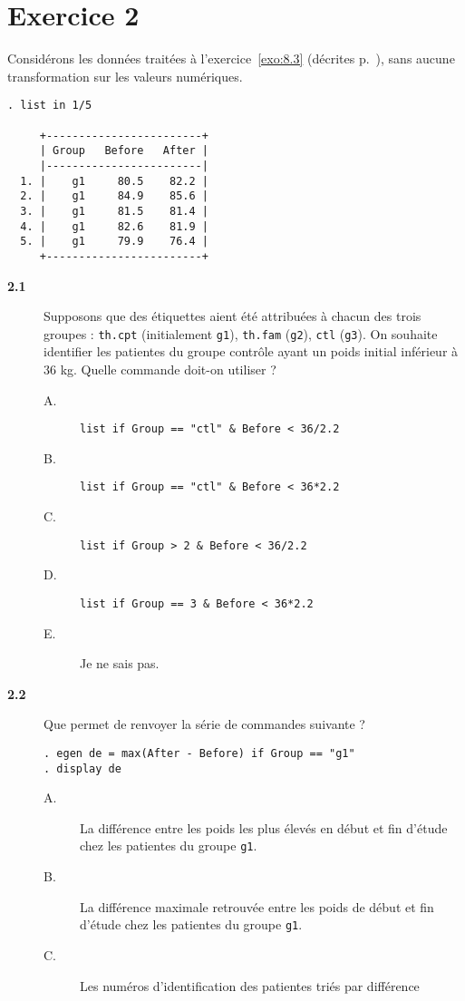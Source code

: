 \section*{Exercice 2}
Considérons les données traitées à l'exercice~\ref{exo:8.3} (décrites
p.~\pageref{exo:8.3}), sans aucune transformation sur les valeurs
numériques. 
\begin{verbatim}
. list in 1/5

     +------------------------+
     | Group   Before   After |
     |------------------------|
  1. |    g1     80.5    82.2 |
  2. |    g1     84.9    85.6 |
  3. |    g1     81.5    81.4 |
  4. |    g1     82.6    81.9 |
  5. |    g1     79.9    76.4 |
     +------------------------+
\end{verbatim}
\begin{description}
\item[\bf 2.1] Supposons que des étiquettes aient été attribuées à chacun
  des trois groupes : \texttt{th.cpt} (initialement \texttt{g1}),
  \texttt{th.fam} (\texttt{g2}), \texttt{ctl} (\texttt{g3}). On souhaite
  identifier les patientes du groupe contrôle ayant un poids initial
  inférieur à 36 kg. Quelle commande doit-on utiliser ?
  \begin{description}
  \item[A.] \verb|list if Group == "ctl" & Before < 36/2.2|
  \item[B.] \verb|list if Group == "ctl" & Before < 36*2.2|
  \item[C.] \verb|list if Group > 2 & Before < 36/2.2|
  \item[D.] \verb|list if Group == 3 & Before < 36*2.2|
  \item[E.] Je ne sais pas.
  \end{description}  
\item[\bf 2.2] Que permet de renvoyer la série de commandes suivante ?
\begin{verbatim}
. egen de = max(After - Before) if Group == "g1"
. display de
\end{verbatim}
  \begin{description}
  \item[A.] La différence entre les poids les plus élevés en début et fin
    d'étude chez les patientes du groupe \texttt{g1}.    
  \item[B.] La différence maximale retrouvée entre les poids de début et fin
    d'étude chez les patientes du groupe \texttt{g1}.
  \item[C.] Les numéros d'identification des patientes triés par différence

\end{description}
\end{description}
